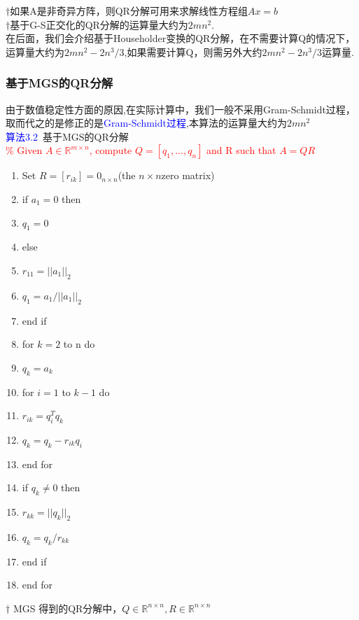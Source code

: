 \documentclass[12pt,a4paper]{article}
\begin{document}
$\dagger$如果A是非奇异方阵，则QR分解可用来求解线性方程组$Ax=b$\\

$\dagger$基于G-S正交化的QR分解的运算量大约为$2mn^{2}$.\\

在后面，我们会介绍基于Householder变换的QR分解，在不需要计算Q的情况下，运算量大约为$2mn^{2}-2n^{3}/3$,如果需要计算Q，则需另外大约$2mn^{2}-2n^{3}/3$运算量.\\
\subsubsection{基于MGS的QR分解}
由于数值稳定性方面的原因,在实际计算中，我们一般不采用Gram-Schmidt过程，取而代之的是修正的是\textcolor{blue}{Gram-Schmidt过程},本算法的运算量大约为$2mn^{2}$\\
\textcolor{blue}{算法3.2}~基于MGS的QR分解\\
\textcolor{red}{\% Given $A \in \mathbb{R}^{m\times n}$, compute $Q = [q_{1},...,q_{n}]$ and R such that $A = QR$}\\
\begin{enumerate}
	\item Set $R=[r_{ik}]=0_{n\times n}$(the $n\times n$zero matrix)
	\item if $a_{1}=0$ then 
	\item \qquad $q_{1}=0$
	\item else
	\item \qquad $r_{11}=||a_{1}||_{2}$
	\item \qquad $q_{1}=a_{1}/||a_{1}||_{2}$
	\item end if
	\item for $k=2$ to n do
	\item \qquad $q_{k} = a_{k}$
	\item \qquad for $i = 1$ to $k-1$ do
	\item \qquad \qquad $r_{ik}=q_{i}^{T}q_{k}$
	\item \qquad \qquad $q_{k}=q_{k}-r_{ik}q_{i}$
	\item \qquad end for 
	\item \qquad if $q_{k}\ne 0$ then
	\item \qquad \qquad $r_{kk}=||q_{k}||_{2}$
	\item \qquad \qquad $q_{k}=q_{k}/r_{kk}$
	\item \qquad end if
	\item end for  
\end{enumerate}
$\dagger$ MGS 得到的QR分解中，$Q\in\mathbb{R}^{n\times n},R\in\mathbb{R}^{n\times n}$
\end{document}
